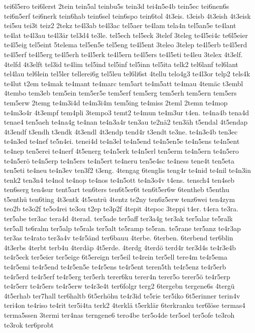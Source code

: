 {tei6l5ero
tei6lerst
2tein
tein5al
teinbu5s
tein3d
tei4n5e4b
tein5ec
tei6nen6s
tei6n5erf
tei6nerk
tein6hab
tein6sel
tein6spo
tein6tol
4t3eis.
t3eisb
4t3eish
4t3eisk
tei5su
tei3t
teiz2
2tekz
te4l3ab
te4l3ac
tel5aer
te4lam
tela4n
tel5an5e
te4lant
te4lat
te4l3au
te4l3är
tel3d4
te3le.
tel5ech
tel5eck
3telef
3teleg
te4l5ei4c
te6l5eier
te4l5eig
tel5eint
5telema
tel5en5e
tel5eng
te4l5ent
3teleo
3telep
te4l5erb
te4l5erd
te4l5erf
te4l5erg
te4l5erh
te4l5erk
te4l5ern
te4l5ers
te4l5eti
te4leu
3telex
4t3elf.
4telfd
4t3elft
tel3id
te4lim
tel5ind
tel5inf
tel5inn
tel5ita
telk2
tel6lanf
tel6lant
tel4lau
tel6lein
tel5ler
tellerei6g
tel5leu
tel6li6st
4tellu
telo4g3
te4l3or
telp2
tels4k
te4lut
t2em
te4mak
te4mant
te4marc
tem5art
te4m5att
te4mau
4temäc
t3embl
4tembo
tem3eb
tem5ein
tem5er5e
tem5erf
tem5erg
tem5erh
tem5ern
tem5ers
tem5erw
2temg
te4m3i4d
te4m3i4m
tem5ing
te4miss
2teml
2temn
te4mop
te4m3o4r
4t3empf
tem4pli
3tempo3
temt2
te4mun
te4m3ur
t4en.
te4na4b
tena4d
tenae4
ten5aeh
te4na4g
te4nan
te4n3a4r
ten3au
te2nä2
ten3äh
t5endal
4t5endap
4t3endf
t3endh
t3endk
4t3endl
4t3endp
tend4r
t3endt
te3ne.
te4n3e4b
ten3ec
te4n3ed
te4nef
te5n4ei.
tenei4d
te4n3el
te4n5end
te4n5en5e
te4n5ens
te4n5ent
te4nep
ten5erei
te4nerf
4t5energ
te4n5erk
te4n5erl
ten5erm
te4n5ern
te4n5ero
te4n5erö
te4n5erp
te4n5ers
te4n5ert
te4neru
ten5e4sc
te4ness
tene4t
ten5eta
ten5eti
te4neu
te4n3ev
ten3f2
t3eng.
4tengag
6tenglis
teng4r
te4nid
te4nil
te4n3in
tenk2
ten3n4
te4nol
te4nop
te4nos
te4n5ott
te4n3o4v
t4ens.
tensch4
ten4seb
ten6serg
ten4sur
tent5art
ten6ters
ten6t5er6t
ten6t5er6w
6tentheb
t5enthu
t5enthü
ten6ting
4t3entk
4t5entrü
4tentz
te2ny
ten6z5erw
tenz6wei
ten4zym
teo2b
te3o2f
te5o4rei
te3ou
t2ep
te3p2f
4tepit
4tepoc
3teppi
t4er.
t4era
te3ra.
ter5abe
ter3ac
tera4d
4terad.
ter5ade
ter5aff
ter3a4g
ter3ak
ter5alar
te5ralk
ter5all
te6ralm
ter5alp
te5rals
ter5alt
te5ramp
te5ran.
te5rane
ter5anz
te4r3ap
ter3as
te4rato
ter3a4v
te4r5änd
ter6bauu
4terbe.
6terben.
6terbend
ter6blin
4t3erbs
4terbt
terb4u
4terdäp
4t5erde.
4terdg
4terdö
terd4r
ter3d4s
te4r3e4b
te4r5eck
ter5eier
ter5eige
6t5ereign
ter5eil
te4rein
ter5ell
tere4m
te4r5ema
te4r5emi
te4r5end
te4r5en5e
te4r5ens
te4r5ent
teren5th
te4r5enz
te4r5erb
te4r5erd
te4r5erf
te4r5erg
ter5erh
terer6ku
terer4n
terer5o
terer5ö
te4r5erp
te4r5err
te4r5ers
te4r5erw
te4r3e4t
ter6folgr
terg2
6tergebn
tergene6s
4tergü
4t5erhab
ter7hall
ter6haltb
6t5erhöhu
te4r3id
te5rie
ter5iko
6t5erinner
terin4v
teri4on
te4riso
te4rit
ter5i4ta
terk2
4terklä
t5erklär
6terkranku
ter6löse
termas4
terma5ssen
3termi
ter4nas
terngene6
tero4be
ter5o4de
ter5oel
ter5ofe
te3roh
te3rok
ter6probt
}
